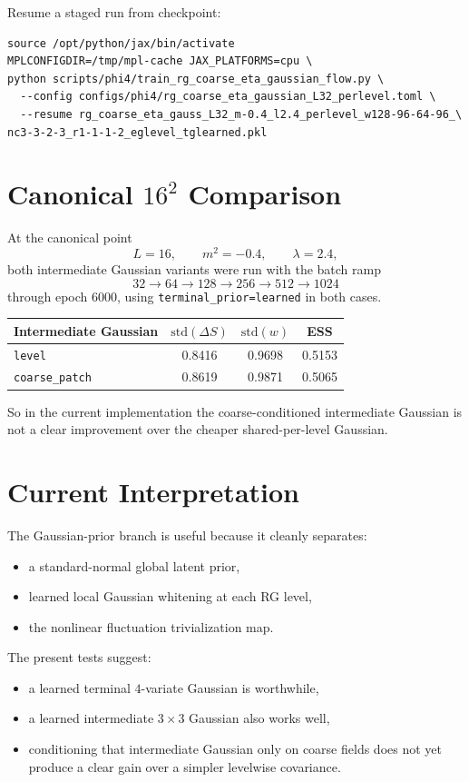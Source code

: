 \documentclass[11pt]{article}
\begin{document}
Resume a staged run from checkpoint:
\begin{verbatim}
source /opt/python/jax/bin/activate
MPLCONFIGDIR=/tmp/mpl-cache JAX_PLATFORMS=cpu \
python scripts/phi4/train_rg_coarse_eta_gaussian_flow.py \
  --config configs/phi4/rg_coarse_eta_gaussian_L32_perlevel.toml \
  --resume rg_coarse_eta_gauss_L32_m-0.4_l2.4_perlevel_w128-96-64-96_\
nc3-3-2-3_r1-1-1-2_eglevel_tglearned.pkl
\end{verbatim}

\section{Canonical $16^2$ Comparison}

At the canonical point
\[
L=16, \qquad m^2=-0.4, \qquad \lambda=2.4,
\]
both intermediate Gaussian variants were run with the batch ramp
\[
32 \to 64 \to 128 \to 256 \to 512 \to 1024
\]
through epoch $6000$, using \texttt{terminal\_prior=learned} in both cases.

\begin{center}
\begin{tabular}{lccc}
\toprule
Intermediate Gaussian & $\mathrm{std}(\Delta S)$ & $\mathrm{std}(w)$ & ESS \\
\midrule
\texttt{level} & 0.8416 & 0.9698 & 0.5153 \\
\texttt{coarse\_patch} & 0.8619 & 0.9871 & 0.5065 \\
\bottomrule
\end{tabular}
\end{center}

So in the current implementation the coarse-conditioned intermediate Gaussian is
not a clear improvement over the cheaper shared-per-level Gaussian.

\section{Current Interpretation}

The Gaussian-prior branch is useful because it cleanly separates:
\begin{itemize}
\item a standard-normal global latent prior,
\item learned local Gaussian whitening at each RG level,
\item the nonlinear fluctuation trivialization map.
\end{itemize}

The present tests suggest:
\begin{itemize}
\item a learned terminal $4$-variate Gaussian is worthwhile,
\item a learned intermediate $3 \times 3$ Gaussian also works well,
\item conditioning that intermediate Gaussian only on coarse fields does not
yet produce a clear gain over a simpler levelwise covariance.
\end{itemize}
\end{document}
